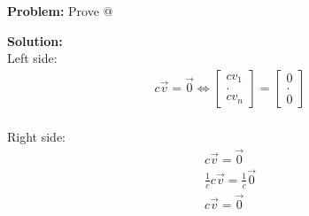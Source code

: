 \documentclass[11pt]{article}
\makeatletter
\theoremstyle{plain}
\theoremstyle{remark}
\theoremstyle{plain}
\newcommand{\bd}{\textbf}
\newcommand*{\rom}[1]{\expandafter\@slowromancap\romannumeral #1@}
\makeatother
\begin{document}
\begin{tcolorbox}[colback=magenta!5!white,colframe = magenta!75!black,title=Example]
    \bd{Problem:} Prove \rom{11}

    \bd{Solution:} \\

    Left side:
    \begin{align*}
        c\overrightarrow{v} = \overrightarrow{0} \iff \begin{bmatrix}
            cv_1 \\ . \\cv_n
        \end{bmatrix} =  \begin{bmatrix}
            0 \\ . \\0
        \end{bmatrix} \\
    \end{align*}

    Right side:
    \begin{align*}
        c\overrightarrow{v} = \overrightarrow{0} \\
        \frac{1}{c}c\overrightarrow{v} = \frac{1}{c}\overrightarrow{0} \\
        c\overrightarrow{v} = \overrightarrow{0} \\
    \end{align*}

\end{tcolorbox}   
\end{document}
